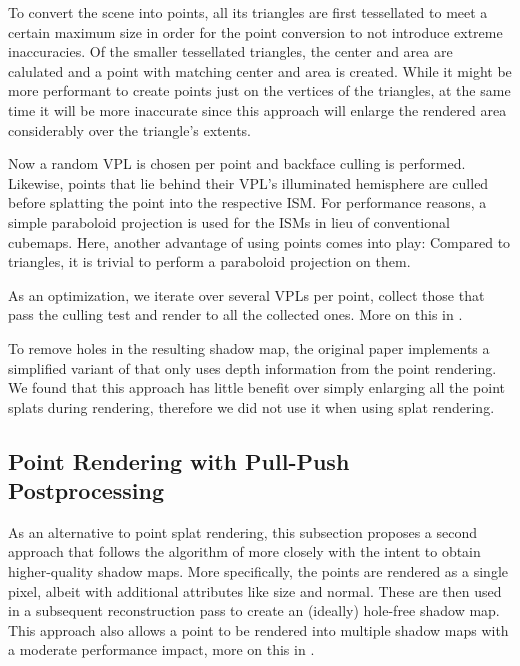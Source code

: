 To convert the scene into points, all its triangles are first tessellated to meet a certain maximum size in order for the point conversion to not introduce extreme inaccuracies. Of the smaller tessellated triangles, the center and area are calulated and a point with matching center and area is created. While it might be more performant to create points just on the vertices of the triangles, at the same time it will be more inaccurate since this approach will enlarge the rendered area considerably over the triangle's extents.

Now a random VPL is chosen per point and backface culling is performed. Likewise, points that lie behind their VPL's illuminated hemisphere are culled before splatting the point into the respective ISM. For performance reasons, a simple paraboloid projection is used for the ISMs in lieu of conventional cubemaps. Here, another advantage of using points comes into play: Compared to triangles, it is trivial to perform a paraboloid projection on them.

As an optimization, we iterate over several VPLs per point, collect those that pass the culling test and render to all the collected ones. More on this in .

To remove holes in the resulting shadow map, the original paper implements a simplified variant of \cite{Marroquim:2007:reconstruction} that only uses depth information from the point rendering. We found that this approach has little benefit over simply enlarging all the point splats during rendering, therefore we did not use it when using splat rendering.



\subsection{Point Rendering with Pull-Push Postprocessing}

As an alternative to point splat rendering, this subsection proposes a second approach that follows the algorithm of \cite{Marroquim:2007:reconstruction} more closely with the intent to obtain higher-quality shadow maps. More specifically, the points are rendered as a single pixel, albeit with additional attributes like size and normal. These are then used in a subsequent reconstruction pass to create an (ideally) hole-free shadow map. This approach also allows a point to be rendered into multiple shadow maps with a moderate performance impact, more on this in .

